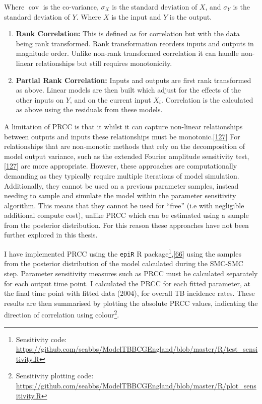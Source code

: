 \documentclass[11pt,twoside]{bristolthesis}
\begin{document}
  Where \(\operatorname {cov}\) is the co-variance, \(\sigma _{X}\) is the standard deviation of \(X\), and \(\sigma_Y\) is the standard deviation of \(Y\). Where \(X\) is the input and \(Y\) is the output.
  \begin{enumerate}
  \def\labelenumi{\arabic{enumi}.}
  \setcounter{enumi}{1}
  \item
    \textbf{Rank Correlation:} This is defined as for correlation but with the data being rank transformed. Rank transformation reorders inputs and outputs in magnitude order. Unlike non-rank transformed correlation it can handle non-linear relationships but still requires monotonicity.
  \item
    \textbf{Partial Rank Correlation:} Inputs and outputs are first rank transformed as above. Linear models are then built which adjust for the effects of the other inputs on \(Y\), and on the current input \(X_i\). Correlation is the calculated as above using the residuals from these models.
  \end{enumerate}
  A limitation of PRCC is that it whilst it can capture non-linear relationships between outputs and inputs these relationships must be monotonic.{[}\protect\hyperlink{ref-Marino2009a}{127}{]} For relationships that are non-monotic methods that rely on the decomposition of model output variance, such as the extended Fourier amplitude sensitivity test,{[}\protect\hyperlink{ref-Marino2009a}{127}{]} are more appropriate. However, these approaches are computationally demanding as they typically require multiple iterations of model simulation. Additionally, they cannot be used on a previous parameter samples, instead needing to sample and simulate the model within the parameter sensitivity algorithm. This means that they cannot be used for ``free'' (i.e with negligible additional compute cost), unlike PRCC which can be estimated using a sample from the posterior distribution. For this reason these approaches have not been further explored in this thesis.
  
  I have implemented PRCC using the \texttt{epiR} R package\footnote{Sensitivity code: \url{https://github.com/seabbs/ModelTBBCGEngland/blob/master/R/test_sensitivity.R}},{[}\protect\hyperlink{ref-EpiR}{66}{]} using the samples from the posterior distribution of the model calculated during the SMC-SMC step. Parameter sensitivity measures such as PRCC must be calculated separately for each output time point. I calculated the PRCC for each fitted parameter, at the final time point with fitted data (2004), for overall TB incidence rates. These results are then summarised by plotting the absolute PRCC values, indicating the direction of correlation using colour\footnote{Sensitivity plotting code: \url{https://github.com/seabbs/ModelTBBCGEngland/blob/master/R/plot_sensitivity.R}}.
  
\end{document}
